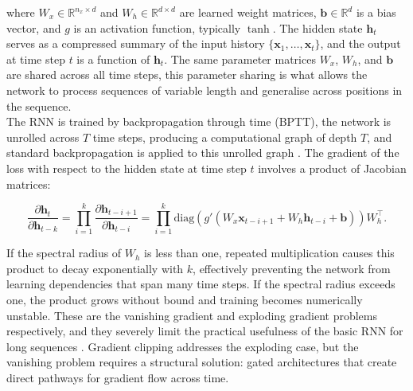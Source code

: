     \noindent 
    where $W_x \in \mathbb{R}^{n_x \times d}$ and $W_h \in \mathbb{R}^{d \times d}$ are learned weight matrices, $\mathbf{b} \in \mathbb{R}^d$ is a bias vector, and $g$ is an activation function, typically $\tanh$. The hidden state $\mathbf{h}_t$ serves as a compressed summary of the input history $\{\mathbf{x}_1, \ldots, \mathbf{x}_t\}$, and the output at time step $t$ is a function of $\mathbf{h}_t$. The same parameter matrices $W_x$, $W_h$, and $\mathbf{b}$ are shared across all time steps, this parameter sharing is what allows the network to process sequences of variable length and generalise across positions in the sequence. \\

    \noindent
    The RNN is trained by backpropagation through time (BPTT), the network is unrolled across $T$ time steps, producing a computational graph of depth $T$, and standard backpropagation is applied to this unrolled graph \citep{goodfellow2016deep}. The gradient of the loss with respect to the hidden state at time step $t$ involves a product of Jacobian matrices:

    \[
    \frac{\partial \mathbf{h}_t}{\partial \mathbf{h}_{t-k}}
    = \prod_{i=1}^{k} \frac{\partial \mathbf{h}_{t-i+1}}{\partial \mathbf{h}_{t-i}}
    = \prod_{i=1}^{k} \mathrm{diag}\!\left(g'(W_x \mathbf{x}_{t-i+1}
    + W_h \mathbf{h}_{t-i} + \mathbf{b})\right) W_h^{\top}.
    \]

    \noindent 
    If the spectral radius of $W_h$ is less than one, repeated multiplication causes this product to decay exponentially with $k$, effectively preventing the network from learning dependencies that span many time steps. If the spectral radius exceeds one, the product grows without bound and training becomes numerically unstable. These are the vanishing gradient and exploding gradient problems respectively, and they severely limit the practical usefulness of the basic RNN for long sequences \citep{hochreiter1997long}. Gradient clipping addresses the exploding case, but the vanishing problem requires a structural solution: gated architectures that create direct pathways for gradient flow across time. \\

